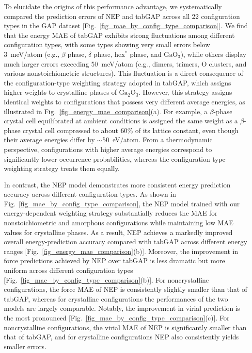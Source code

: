 \documentclass[aip,graphicx,amsmath,amssymb]{revtex4-1}
\newcommand{\ga}{$\text{Ga}_2\text{O}_3$}
\begin{document}
To elucidate the origins of this performance advantage, we systematically compared 
the prediction errors of NEP and tabGAP across all 22 configuration types in the GAP dataset
[Fig.~\ref{fig_mae_by_config_type_comparison}].
We find that the energy MAE of tabGAP exhibits strong fluctuations among different configuration
types, with some types showing very small errors below 3~meV/atom (e.g., $\beta$ phase,
$\delta$ phase, hex$^{*}$ phase, and $\text{GaO}_3$), while others display much larger errors
exceeding 50~meV/atom (e.g., dimers, trimers, O clusters, and various nonstoichiometric
structures).
This fluctuation is a direct consequence of the configuration-type weighting strategy adopted
in tabGAP, which assigns higher weights to crystalline phases of \ga.\cite{zhao_complex_2023} 
However, this strategy assigns identical weights to configurations that possess very different
average energies, as illustrated in Fig.~\ref{fig_energy_mae_comparison}(a).
For example, a $\beta$-phase crystal cell equilibrated at ambient conditions is assigned the
same weight as a $\beta$-phase crystal cell compressed to about 60\% of its lattice constant,
even though their average energies differ by $\sim$50~eV/atom.
From a thermodynamic perspective, configurations with higher average energies correspond to
significantly lower occurrence probabilities, whereas the configuration-type weighting strategy 
treats them equally.

In contrast, the NEP model demonstrates more consistent energy prediction accuracy
across different configuration types.
As shown in Fig.~\ref{fig_mae_by_config_type_comparison}, the NEP model trained with our 
energy-dependent weighting strategy 
substantially reduces the MAE for nonstoichiometric and amorphous
configurations while maintaining low MAE values for crystalline phases.
As a result, NEP achieves a markedly improved overall energy-prediction accuracy compared with
tabGAP across different energy ranges
[Fig.~\ref{fig_energy_mae_comparison}(b)].
Moreover, the improvement in force predictions achieved by NEP over tabGAP is less dramatic
but more uniform across different configuration types
[Fig.~\ref{fig_mae_by_config_type_comparison}(b)].
For noncrystalline configurations, the force MAE of NEP is consistently slightly smaller
than that of tabGAP, whereas for crystalline configurations the performances of the two
models are largely comparable.
Notably, the improvement in virial prediction is the most pronounced
[Fig.~\ref{fig_mae_by_config_type_comparison}(c)].
For noncrystalline configurations, the virial MAE of NEP is significantly smaller than that
of tabGAP, and for crystalline configurations NEP also consistently yields smaller errors.
\end{document}
